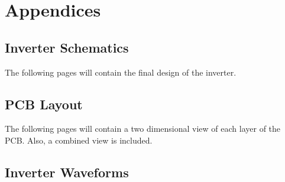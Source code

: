 \documentclass[11pt,titlepage]{report}
\begin{document}
\chapter{Appendices}
\section{Inverter Schematics}
\label{app:schematics}
The following pages will contain the final design of the inverter.


\section{PCB Layout}
\label{app:pcb_layout}
The following pages will contain a two dimensional view of each layer of the PCB. Also, a combined view is included.


\section{Inverter Waveforms}
\label{app:waveforms}
\end{document}
